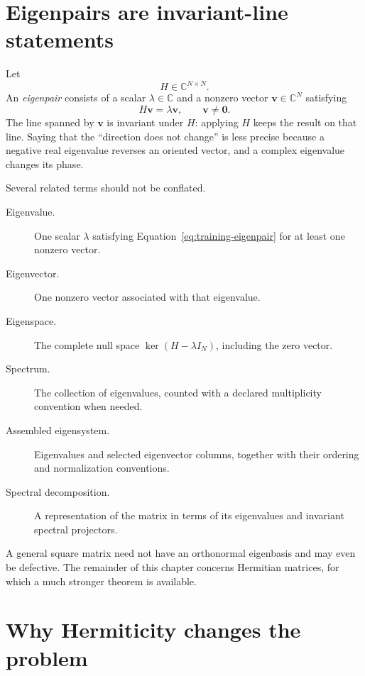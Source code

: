 \section{Eigenpairs are invariant-line statements}

Let
\begin{equation}
  H\in\mathbb C^{N\times N}.
\end{equation}
An \emph{eigenpair} consists of a scalar \(\lambda\in\mathbb C\) and a nonzero
vector \(\mathbf v\in\mathbb C^N\) satisfying
\begin{equation}
  H\mathbf v=\lambda\mathbf v,
  \qquad
  \mathbf v\neq\mathbf 0.
  \label{eq:training-eigenpair}
\end{equation}
The line spanned by \(\mathbf v\) is invariant under \(H\): applying \(H\)
keeps the result on that line. Saying that the ``direction does not change'' is
less precise because a negative real eigenvalue reverses an oriented vector,
and a complex eigenvalue changes its phase.

Several related terms should not be conflated.

\begin{description}
  \item[Eigenvalue.] One scalar \(\lambda\) satisfying
        Equation~\eqref{eq:training-eigenpair} for at least one nonzero vector.
  \item[Eigenvector.] One nonzero vector associated with that eigenvalue.
  \item[Eigenspace.] The complete null space
        \(\ker(H-\lambda I_N)\), including the zero vector.
  \item[Spectrum.] The collection of eigenvalues, counted with a declared
        multiplicity convention when needed.
  \item[Assembled eigensystem.] Eigenvalues and selected eigenvector columns,
        together with their ordering and normalization conventions.
  \item[Spectral decomposition.] A representation of the matrix in terms of
        its eigenvalues and invariant spectral projectors.
\end{description}

A general square matrix need not have an orthonormal eigenbasis and may even be
defective. The remainder of this chapter concerns Hermitian matrices, for
which a much stronger theorem is available.

\section{Why Hermiticity changes the problem}

